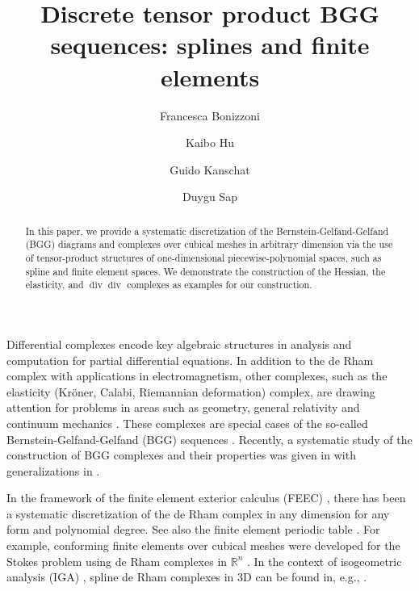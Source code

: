 \documentclass[final]{amsart}%
\author[F. Bonizzoni]{Francesca Bonizzoni}
\author[K. Hu]{Kaibo Hu}
\author[G. Kanschat]{Guido Kanschat}
\author[D. Sap]{Duygu Sap}
\newcommand{\0}{\mathaccent23}
\renewcommand\div{\operatorname{div}}
\begin{document}
\title[Tensor product BGG sequences: splines and FEM]{Discrete tensor product BGG sequences: splines and finite elements}

\maketitle

\begin{abstract}
In this paper, we provide a systematic discretization of the Bern\-stein-Gelfand-Gelfand (BGG) diagrams and complexes over cubical meshes in arbitrary dimension via the use of tensor-product structures of one-dimensional piecewise-polynomial spaces, such as spline and finite element spaces. We demonstrate the construction of the Hessian, the elasticity, and $\div\div$ complexes as examples for our construction. 
\end{abstract}

Differential complexes encode key algebraic structures in analysis and computation for partial differential equations. In addition to the de Rham complex with applications in electromagnetism, other complexes, such as the elasticity (Kr\"oner, Calabi, Riemannian deformation) complex, are drawing attention for problems in areas such as geometry, general relativity and continuum mechanics \cite{angoshtari2015differential,arnold2018finite,Arnold2006a,arnold2021complexes,pauly2016closed,pauly2018divdiv}. 
These complexes are special cases of the so-called Bernstein-Gelfand-Gelfand (BGG) sequences \cite{Arnold2006a,arnold2021complexes,vcap2022bgg,cap2009parabolic,vcap2001bernstein}.  Recently, a systematic study of the construction of BGG complexes and their properties was given in \cite{arnold2021complexes} with generalizations in \cite{vcap2022bgg}.


In the framework of the finite element exterior calculus (FEEC) \cite{arnold2018finite,Arnold.D;Falk.R;Winther.R.2006a,Arnold.D;Falk.R;Winther.R.2010a}, there has been a systematic discretization of the de Rham complex in any dimension for any form and polynomial degree. 
See also the finite element periodic table \cite{arnold2014periodic}. For example, conforming finite elements over cubical meshes were developed for the Stokes problem using de Rham complexes in $\mathbb{R}^n$ \cite{neilan2016stokes}.  In the context of isogeometric analysis (IGA) \cite{cottrell2009isogeometric}, spline de Rham complexes in 3D can be found in, e.g., \cite{buffa2011isogeometric}.
\end{document}
